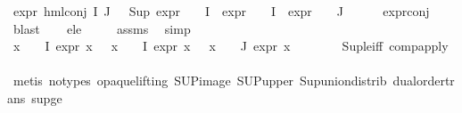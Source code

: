 \begin{isabellebody}
\ {\isachardoublequoteopen}expr{\isacharunderscore}{\kern0pt}{}\ {\isacharparenleft}{\kern0pt}hml{\isacharunderscore}{\kern0pt}conj\ I\ J\ {\isasymPhi}{\isacharparenright}{\kern0pt}\ {\isacharequal}{\kern0pt}\ {\isacharparenleft}{\kern0pt}Sup\ {\isacharparenleft}{\kern0pt}{\isacharparenleft}{\kern0pt}expr{\isacharunderscore}{\kern0pt}{}\ {\isasymcirc}\ {\isasymPhi}{\isacharparenright}{\kern0pt}\ {\isacharbackquote}{\kern0pt}\ I\ {\isasymunion}\ {\isacharparenleft}{\kern0pt}expr{\isacharunderscore}{\kern0pt}{}\ {\isasymcirc}\ {\isasymPhi}{\isacharparenright}{\kern0pt}\ {\isacharbackquote}{\kern0pt}\ I\ {\isasymunion}\ {\isacharparenleft}{\kern0pt}expr{\isacharunderscore}{\kern0pt}{}\ {\isasymcirc}\ {\isasymPhi}{\isacharparenright}{\kern0pt}\ {\isacharbackquote}{\kern0pt}\ J{\isacharparenright}{\kern0pt}{\isacharparenright}{\kern0pt}{\isachardoublequoteclose}\isanewline
\ \ \ \ \isamarkupfalse%
\ expr{\isacharunderscore}{\kern0pt}{}{\isacharunderscore}{\kern0pt}conj\ \isamarkupfalse%
\ blast\isanewline
\ \ \isamarkupfalse%
\ e{}{\isacharunderscore}{\kern0pt}le{\isacharunderscore}{\kern0pt}{}{\isacharcolon}{\kern0pt}\ {\isachardoublequoteopen}{\isachardot}{\kern0pt}{\isachardot}{\kern0pt}{\isachardot}{\kern0pt}\ {\isasymle}\ {}{\isachardoublequoteclose}\ \isamarkupfalse%
\ assms\ \isamarkupfalse%
\ simp\isanewline
\ \ \isamarkupfalse%
\ {\isachardoublequoteopen}{\isasymforall}x\ {\isasymin}\ {\isasymPhi}\ {\isacharbackquote}{\kern0pt}\ I{\isachardot}{\kern0pt}\ expr{\isacharunderscore}{\kern0pt}{}\ x\ {\isasymle}\ {}{\isachardoublequoteclose}\ {\isachardoublequoteopen}{\isasymforall}x\ {\isasymin}\ {\isasymPhi}\ {\isacharbackquote}{\kern0pt}\ I{\isachardot}{\kern0pt}\ expr{\isacharunderscore}{\kern0pt}{}\ x\ {\isasymle}\ {}{\isachardoublequoteclose}\ {\isachardoublequoteopen}{\isasymforall}x\ {\isasymin}\ {\isasymPhi}\ {\isacharbackquote}{\kern0pt}\ J{\isachardot}{\kern0pt}\ expr{\isacharunderscore}{\kern0pt}{}\ x\ {\isasymle}\ {}{\isachardoublequoteclose}\isanewline
\ \ \ \ \isamarkupfalse%
\ Sup{\isacharunderscore}{\kern0pt}le{\isacharunderscore}{\kern0pt}iff\ comp{\isacharunderscore}{\kern0pt}apply\ \isanewline
\ \ \ \ \ \ \isamarkupfalse%
\ {\isacharparenleft}{\kern0pt}metis\ {\isacharparenleft}{\kern0pt}no{\isacharunderscore}{\kern0pt}types{\isacharcomma}{\kern0pt}\ opaque{\isacharunderscore}{\kern0pt}lifting{\isacharparenright}{\kern0pt}\ SUP{\isacharunderscore}{\kern0pt}image\ SUP{\isacharunderscore}{\kern0pt}upper\ Sup{\isacharunderscore}{\kern0pt}union{\isacharunderscore}{\kern0pt}distrib\ dual{\isacharunderscore}{\kern0pt}order{\isachardot}{\kern0pt}trans\ sup{\isacharunderscore}{\kern0pt}ge{}{\isacharparenright}{\kern0pt}\isanewline

\end{isabellebody}
